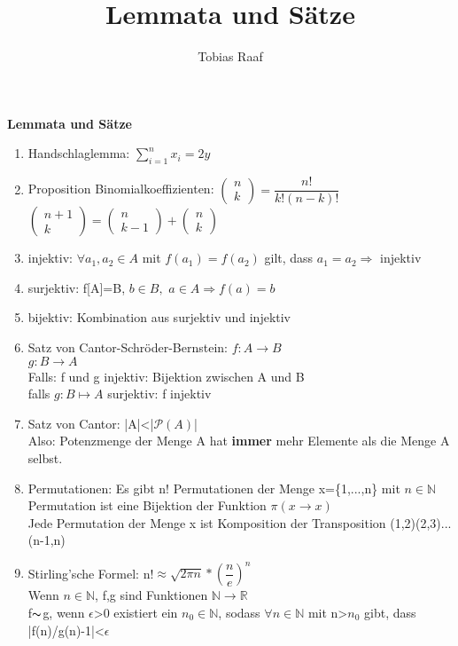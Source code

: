 \documentclass{scrartcl}
\title{Lemmata und Sätze}
\author{Tobias Raaf}
\begin{document}
	\large \textbf{Lemmata und Sätze}
\normalsize	\begin{enumerate}
	\item Handschlaglemma: $\sum_{i=1}^{n}x_i=2y$
	\item Proposition Binomialkoeffizienten: $\begin{pmatrix}
	n\\k
	\end{pmatrix}=\dfrac{n!}{k!(n-k)!}$\\
	$\begin{pmatrix}
	n+1\\k
	\end{pmatrix}=\begin{pmatrix}
		n\\k-1
	\end{pmatrix}+\begin{pmatrix}
	n\\k
	\end{pmatrix}$
	\item injektiv: $\forall a_1,a_2\in A$ mit $f(a_1)=f(a_2)$ gilt, dass $a_1=a_2 \Rightarrow$ injektiv
	\item surjektiv: f[A]=B, $b\in B,$ $a\in A\Rightarrow f(a)=b$
	\item bijektiv: Kombination aus surjektiv und injektiv
	\item Satz von Cantor-Schröder-Bernstein: $f:A\rightarrow B$\\
    $g: B\rightarrow A$ \\
    Falls: f und g injektiv: Bijektion zwischen A und B\\
    falls $g:B\mapsto A$ surjektiv: f injektiv
    \item Satz von Cantor: |A|<|$\mathcal{P}(A)$|\\
    Also: Potenzmenge der Menge A hat \textbf{immer} mehr Elemente als die Menge A selbst.
    \item Permutationen: Es gibt n! Permutationen der Menge x=\{1,...,n\} mit $n\in \mathbb{N}$\\
    Permutation ist eine Bijektion der Funktion $\pi(x\rightarrow x)$\\
    Jede Permutation der Menge x ist Komposition der Transposition (1,2)(2,3)...(n-1,n)
    \item Stirling'sche Formel: n!$\approx \sqrt{2\pi n}*(\dfrac{n}{e})^n$\\
    Wenn $n\in \mathbb{N}$, f,g sind Funktionen $\mathbb{N} \rightarrow \mathbb{R}$\\
    f$\thicksim$g, wenn $\epsilon$>0 existiert ein $n_0\in \mathbb{N}$, sodass $\forall n\in \mathbb{N}$ mit n>$n_0$ gibt, dass |f(n)/g(n)-1|<$\epsilon$

\end{enumerate}
\end{document}
